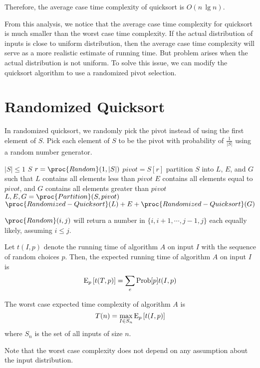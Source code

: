 \begin{enumerate}
    Therefore, the average case time complexity of quicksort is $O(n \, \lg n)$.
\end{enumerate}

From this analysis, we notice that the average case time complexity for quicksort is much smaller than the worst case time complexity. If the actual distribution of inputs is close to uniform distribution, then the average case time complexity will serve as a more realistic estimate of running time. But problem arises when the actual distribution is not uniform. To solve this issue, we can modify the quicksort algorithm to use a randomized pivot selection.

\section{Randomized Quicksort}

In randomized quicksort, we randomly pick the pivot instead of using the first element of $S$. Pick each element of $S$ to be the pivot with probability of $\displaystyle \frac{1}{|S|}$ using a random number generator. 

\begin{codebox}
    \li \If $|S| \leq 1$
    \li \Then \Return $S$ \End
    \li $r = \proc{Random}(1,|S|)$
    \li $pivot = S[r]$ 
    \zi \Comment partition $S$ into $L$, $E$, and $G$ such that $L$ contains all elements less than $pivot$
    \zi \Comment $E$ contains all elements equal to $pivot$, and $G$ contains all elements greater than $pivot$
    \li $L,E,G = \proc{Partition}(S,pivot)$
    \li \Return $\proc{Randomized-Quicksort}(L) + E + \proc{Randomized-Quicksort}(G)$
\end{codebox}

$\proc{Random}(i,j)$ will return a number in $\{i, i+1, \cdots, j-1, j\}$ each equally likely, assuming $i \leq j$.

Let $t(I,p)$ denote the running time of algorithm $A$ on input $I$ with the sequence of random choices $p$. Then, the expected running time of algorithm $A$ on input $I$ is
$$
\mathrm{E}_p \left[ t(T,p) \right] = \sum_e \mathrm{Prob} [p] t(I,p)
$$

The worst case expected time complexity of algorithm $A$ is
$$
T(n) = \max_{I \in S_n} \mathrm{E}_p \left[ t(I,p) \right]
$$
where $S_n$ is the set of all inputs of size $n$.

Note that the worst case complexity does not depend on any assumption about the input distribution.